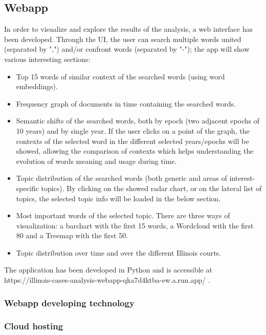 \subsection{Webapp}
In order to visualize and explore the results of the analysis, a web interface has been developed. Through the UI, the
user can search multiple words united (separated by ",") and/or confront words (separated by "-"); the app will show
various interesting sections:
\begin{itemize}
  \item Top 15 words of similar context of the searched words (using word embeddings).
  \item Frequency graph of documents in time containing the searched words.
  \item Semantic shifts of the searched words, both by epoch (two adjacent epochs of 10 years) and by single year.
    If the user clicks on a point of the graph, the contexts of the selected word in the different selected years/epochs
    will be showed, allowing the comparison of contexts which helps understanding the evolution of words meaning and usage
    during time.
  \item Topic distribution of the searched words (both generic and areas of interest-specific topics). By clicking on the
    showed radar chart, or on the lateral list of topics, the selected topic info will be loaded in the below section.
  \item Most important words of the selected topic. There are three ways of visualization: a barchart with the first 15
    words, a Wordcloud with the first 80 and a Treemap with the first 50.
  \item Topic distribution over time and over the different Illinois courts.
\end{itemize}
The application has been developed in Python and is accessible at https://illinois-cases-analysis-webapp-qka7d4ktba-ew.a.run.app/ .
\subsubsection{Webapp developing technology}
\subsubsection{Cloud hosting}
